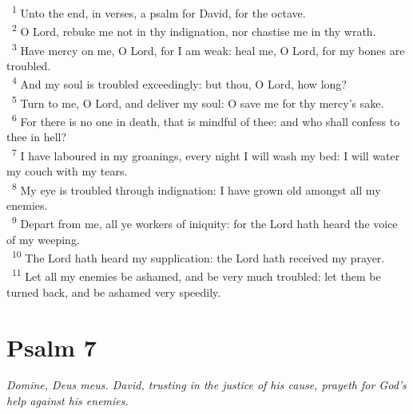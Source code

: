 \documentclass[a5paper,12pt]{article}
\begin{document}
\begin{multicols*}{2}
~\textsuperscript{1} Unto the end, in verses, a psalm for David, for the octave.\\
~\textsuperscript{2} O Lord, rebuke me not in thy indignation, nor chastise me in thy wrath.\\
~\textsuperscript{3} Have mercy on me, O Lord, for I am weak: heal me, O Lord, for my bones are troubled.\\
~\textsuperscript{4} And my soul is troubled exceedingly: but thou, O Lord, how long?\\
~\textsuperscript{5} Turn to me, O Lord, and deliver my soul: O save me for thy mercy's sake.\\
~\textsuperscript{6} For there is no one in death, that is mindful of thee: and who shall confess to thee in hell?\\
~\textsuperscript{7} I have laboured in my groanings, every night I will wash my bed: I will water my couch with my tears.\\
~\textsuperscript{8} My eye is troubled through indignation: I have grown old amongst all my enemies.\\
~\textsuperscript{9} Depart from me, all ye workers of iniquity: for the Lord hath heard the voice of my weeping.\\
~\textsuperscript{10} The Lord hath heard my supplication: the Lord hath received my prayer.\\
~\textsuperscript{11} Let all my enemies be ashamed, and be very much troubled: let them be turned back, and be ashamed very speedily.\\

\section{Psalm 7}
\label{sec:org4676d70}
\emph{Domine, Deus meus. David, trusting in the justice of his cause, prayeth for God's help against his enemies.}\\


\end{multicols*}
\end{document}

